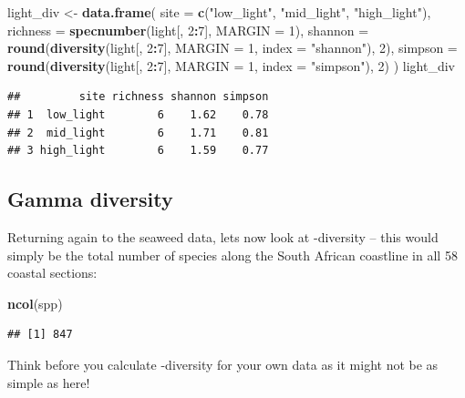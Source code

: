 \documentclass[10pt,a4,]{article}
\newenvironment{Shaded}{\begin{snugshade}}{\end{snugshade}}
\newcommand{\DataTypeTok}[1]{\textcolor[rgb]{0.13,0.29,0.53}{#1}}
\newcommand{\DecValTok}[1]{\textcolor[rgb]{0.00,0.00,0.81}{#1}}
\newcommand{\KeywordTok}[1]{\textcolor[rgb]{0.13,0.29,0.53}{\textbf{#1}}}
\newcommand{\NormalTok}[1]{#1}
\newcommand{\OperatorTok}[1]{\textcolor[rgb]{0.81,0.36,0.00}{\textbf{#1}}}
\newcommand{\StringTok}[1]{\textcolor[rgb]{0.31,0.60,0.02}{#1}}
\begin{document}
\begin{Shaded}
\begin{Highlighting}[]
\NormalTok{light\_div <{-}}\StringTok{ }\KeywordTok{data.frame}\NormalTok{(}
  \DataTypeTok{site =} \KeywordTok{c}\NormalTok{(}\StringTok{"low\_light"}\NormalTok{, }\StringTok{"mid\_light"}\NormalTok{, }\StringTok{"high\_light"}\NormalTok{),}
  \DataTypeTok{richness =} \KeywordTok{specnumber}\NormalTok{(light[, }\DecValTok{2}\OperatorTok{:}\DecValTok{7}\NormalTok{], }\DataTypeTok{MARGIN =} \DecValTok{1}\NormalTok{),}
  \DataTypeTok{shannon =} \KeywordTok{round}\NormalTok{(}\KeywordTok{diversity}\NormalTok{(light[, }\DecValTok{2}\OperatorTok{:}\DecValTok{7}\NormalTok{], }\DataTypeTok{MARGIN =} \DecValTok{1}\NormalTok{, }\DataTypeTok{index =} \StringTok{"shannon"}\NormalTok{), }\DecValTok{2}\NormalTok{),}
  \DataTypeTok{simpson =} \KeywordTok{round}\NormalTok{(}\KeywordTok{diversity}\NormalTok{(light[, }\DecValTok{2}\OperatorTok{:}\DecValTok{7}\NormalTok{], }\DataTypeTok{MARGIN =} \DecValTok{1}\NormalTok{, }\DataTypeTok{index =} \StringTok{"simpson"}\NormalTok{), }\DecValTok{2}\NormalTok{)}
\NormalTok{)}
\NormalTok{light\_div}
\end{Highlighting}
\end{Shaded}

\begin{verbatim}
##         site richness shannon simpson
## 1  low_light        6    1.62    0.78
## 2  mid_light        6    1.71    0.81
## 3 high_light        6    1.59    0.77
\end{verbatim}

\subsection{Gamma diversity}

Returning again to the seaweed data, lets now look at
\textgamma-diversity -- this would simply be the total number of species
along the South African coastline in all 58 coastal sections:

\begin{Shaded}
\begin{Highlighting}[]
\KeywordTok{ncol}\NormalTok{(spp)}
\end{Highlighting}
\end{Shaded}

\begin{verbatim}
## [1] 847
\end{verbatim}

Think before you calculate \textgamma-diversity for your own data as it
might not be as simple as here!
\end{document}
